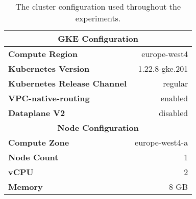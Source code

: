\begin{table*}[!t]
\centering

\begin{tabular}{l r}


\toprule
\multicolumn{2}{c}{\textbf{GKE Configuration}}       \\
\toprule

\textbf{Compute Region}    & europe-west4            \\
\textbf{Kubernetes Version}& 1.22.8-gke.201          \\
\textbf{Kubernetes Release Channel} & regular        \\
\textbf{VPC-native-routing}         & enabled        \\
\textbf{Dataplane V2}               & disabled       \\

\toprule
\multicolumn{2}{c}{\textbf{Node Configuration}} \\
\toprule

\textbf{Compute Zone}               & europe-west4-a \\
\textbf{Node Count}                 & 1              \\
\textbf{vCPU}                       & 2              \\
\textbf{Memory}                     & 8 GB           \\  

\bottomrule

\end{tabular}


\caption{The cluster configuration used throughout the experiments.}
\label{tab:experiment:design:cluster-config}
\end{table*}